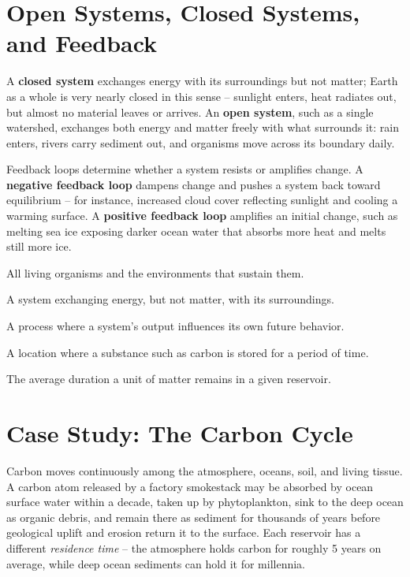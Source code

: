 \documentclass[11pt,a4paper]{scrreprt}
\begin{document}
\section{Open Systems, Closed Systems, and Feedback}

A \textbf{closed system} exchanges energy with its surroundings but not matter; Earth as a whole
is very nearly closed in this sense -- sunlight enters, heat radiates out, but almost no material
leaves or arrives. An \textbf{open system}, such as a single watershed, exchanges both energy and
matter freely with what surrounds it: rain enters, rivers carry sediment out, and organisms move
across its boundary daily.

Feedback loops determine whether a system resists or amplifies change. A \textbf{negative
feedback loop} dampens change and pushes a system back toward equilibrium -- for instance,
increased cloud cover reflecting sunlight and cooling a warming surface. A \textbf{positive
feedback loop} amplifies an initial change, such as melting sea ice exposing darker ocean water
that absorbs more heat and melts still more ice.

\begin{termsbox}
\begin{description}[leftmargin=3.6cm,itemsep=1pt,topsep=1pt]
  \item[Biosphere] All living organisms and the environments that sustain them.
  \item[Closed system] A system exchanging energy, but not matter, with its surroundings.
  \item[Feedback loop] A process where a system's output influences its own future behavior.
  \item[Reservoir] A location where a substance such as carbon is stored for a period of time.
  \item[Residence time] The average duration a unit of matter remains in a given reservoir.
\end{description}
\end{termsbox}

\section{Case Study: The Carbon Cycle}

Carbon moves continuously among the atmosphere, oceans, soil, and living tissue. A carbon atom
released by a factory smokestack may be absorbed by ocean surface water within a decade, taken up
by phytoplankton, sink to the deep ocean as organic debris, and remain there as sediment for
thousands of years before geological uplift and erosion return it to the surface. Each reservoir
has a different \textit{residence time} -- the atmosphere holds carbon for roughly 5 years on
average, while deep ocean sediments can hold it for millennia.
\end{document}
